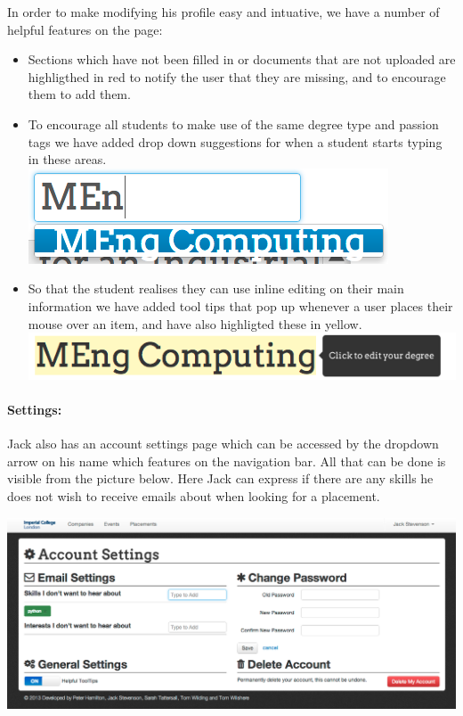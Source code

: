     In order to make modifying his profile easy and intuative, we have a number of helpful features on the page:
    \begin{itemize}
      \item Sections which have not been filled in or documents that are not uploaded are highligthed in red to notify the user that they are missing, and to encourage them to add them.
      \item To encourage all students to make use of the same degree type and passion tags we have added drop down suggestions for when a student starts typing in these areas.
      \includegraphics[scale=0.5]{images/user_experiences/student/edit_suggestions}
      \item So that the student realises they can use inline editing on their main information we have added tool tips that pop up whenever a user places their mouse over an item, and have also highligted these in yellow.
      \includegraphics[scale=0.5]{images/user_experiences/student/edit_degree_tooltip}
    \end{itemize} 

  \paragraph{Settings:}
    Jack also has an account settings page which can be accessed by the dropdown arrow on his name which features on the navigation bar. All that can be done is visible from the picture below. Here Jack can express if there are any skills he does not wish to receive emails about when looking for a placement.

    \includegraphics[scale=0.3]{images/user_experiences/student/account_settings}

